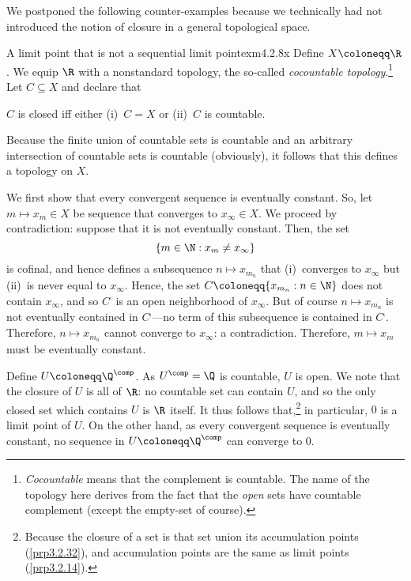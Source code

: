 We postponed the following counter-examples because we technically had not introduced the notion of closure in a general topological space.
\begin{exm}{A limit point that is not a sequential limit point}{exm4.2.8x}
Define $X\coloneqq \R$.  We equip $\R$ with a nonstandard topology, the so-called \emph{cocountable topology}.\footnote{\emph{Cocountable} means that the complement is countable.  The name of the topology here derives from the fact that the \emph{open} sets have countable complement (except the empty-set of course).}  Let $C\subseteq X$ and declare that
\begin{textequation}
$C$ is closed iff either (i)~$C=X$ or (ii)~$C$ is countable.
\end{textequation}
Because the finite union of countable sets is countable and an arbitrary intersection of countable sets is countable (obviously), it follows that this defines a topology on $X$.

We first show that every convergent sequence is eventually constant.  So, let $m\mapsto x_m\in X$ be sequence that converges to $x_\infty \in X$.  We proceed by contradiction:  suppose that it is not eventually constant.  Then, the set
\begin{equation}
\{ m\in \N :x_m\neq x_\infty \}
\end{equation}
is cofinal, and hence defines a subsequence $n\mapsto x_{m_n}$ that (i)~converges to $x_\infty$ but (ii)~is never equal to $x_\infty$.  Hence, the set $C\coloneqq \{ x_{m_n}:n\in \N \}$ does not contain $x_\infty$, and so $C^{\comp}$ is an open neighborhood of $x_\infty$.  But of course $n\mapsto x_{m_n}$ is not eventually contained in $C^{\comp}$---no term of this subsequence is contained in $C^{\comp}$.  Therefore, $n\mapsto x_{m_n}$ cannot converge to $x_\infty$:  a contradiction.  Therefore, $m\mapsto x_m$ must be eventually constant.

Define $U\coloneqq \Q ^{\comp}$.  As $U^{\comp}=\Q$ is countable, $U$ is open.  We note that the closure of $U$ is all of $\R$:  no countable set can contain $U$, and so the only closed set which contains $U$ is $\R$ itself.  It thus follows that,\footnote{Because the closure of a set is that set union its accumulation points (\cref{prp3.2.32}), and accumulation points are the same as limit points (\cref{prp3.2.14}).} in particular, $0$ is a limit point of $U$.  On the other hand, as every convergent sequence is eventually constant, no sequence in $U\coloneqq \Q ^{\comp}$ can converge to $0$.
\end{exm}
